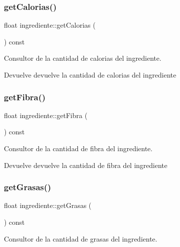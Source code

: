 \subsubsection{\texorpdfstring{get\+Calorias()}{getCalorias()}}
{\footnotesize\ttfamily float ingrediente\+::get\+Calorias (\begin{DoxyParamCaption}{ }\end{DoxyParamCaption}) const}



Consultor de la cantidad de calorias del ingrediente. 

\begin{DoxyReturn}{Devuelve}
devuelve la cantidad de calorias del ingrediente 
\end{DoxyReturn}
\mbox{\label{classingrediente_ad33a9651f19a39c8157dbd7d63c69cdb}} 
\subsubsection{\texorpdfstring{get\+Fibra()}{getFibra()}}
{\footnotesize\ttfamily float ingrediente\+::get\+Fibra (\begin{DoxyParamCaption}{ }\end{DoxyParamCaption}) const}



Consultor de la cantidad de fibra del ingrediente. 

\begin{DoxyReturn}{Devuelve}
devuelve la cantidad de fibra del ingrediente 
\end{DoxyReturn}
\mbox{\label{classingrediente_a6250c0751a2e5bc5adeb0c9de7f209e7}} 
\subsubsection{\texorpdfstring{get\+Grasas()}{getGrasas()}}
{\footnotesize\ttfamily float ingrediente\+::get\+Grasas (\begin{DoxyParamCaption}{ }\end{DoxyParamCaption}) const}



Consultor de la cantidad de grasas del ingrediente. 

